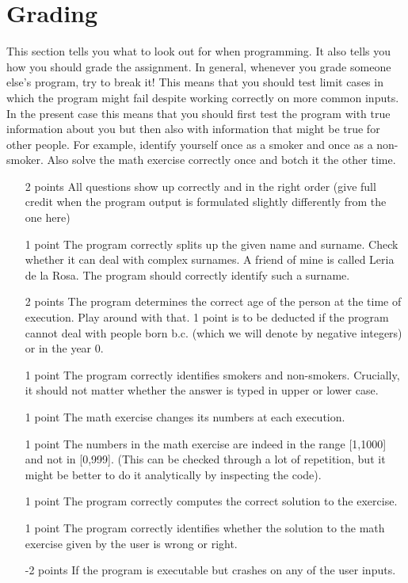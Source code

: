 \documentclass[11pt, leqno, a4paper]{article}
\begin{document}
\section{Grading}
This section tells you what to look out for when programming. It also tells you how you should grade the assignment. In general, whenever you grade 
someone else's program, try to break it! This means that you should test limit cases in which the program might fail despite working correctly
on more common inputs. In the present case this means that you should first test the program with true information about you but then also with
information that might be true for other people. For example, identify yourself once as a smoker and once as a non-smoker. Also solve the
math exercise correctly once and botch it the other time.

\enlargethispage{1cm}

\begin{itemize}
\item[2 points] All questions show up correctly and in the right order (give full credit when the program output is formulated slightly differently from the one here)
\item[1 point] The program correctly splits up the given name and surname. Check whether it can deal with complex surnames. A friend of mine is called
Leria de la Rosa. The program should correctly identify such a surname.
\item[2 points] The program determines the correct age of the person at the time of execution. Play around with that. 1 point is to be deducted if the
program cannot deal with people born b.c. (which we will denote by negative integers) or in the year 0.
\item[1 point] The program correctly identifies smokers and non-smokers. Crucially, it should not matter whether the answer is typed in upper or lower case.
\item[1 point] The math exercise changes its numbers at each execution.
\item[1 point] The numbers in the math exercise are indeed in the range [1,1000] and not in [0,999]. (This can be checked through a lot of repetition, but 
it might be better to do it analytically by inspecting the code). 
\item[1 point] The program correctly computes the correct solution to the exercise.
\item[1 point] The program correctly identifies whether the solution to the math exercise given by the user is wrong or right.
\item[-2 points] If the program is executable but crashes on any of the user inputs.
\end{itemize}
\end{document}
